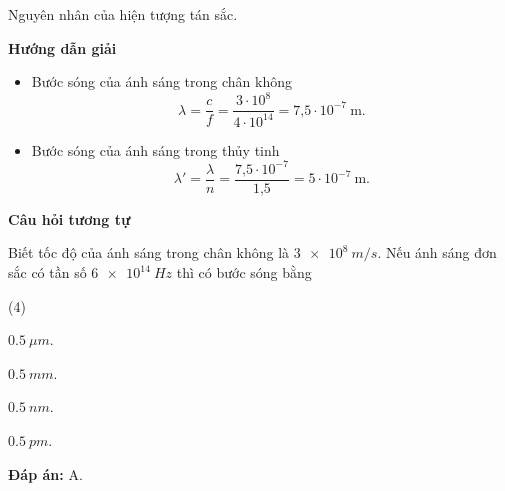 \begin{dang}{Nguyên nhân của hiện tượng tán sắc.}
	{	\begin{center}
			\textbf{Hướng dẫn giải}
		\end{center}
		
		\begin{itemize}
	\item Bước sóng của ánh sáng trong chân không
	\begin{equation*}
		\lambda =\dfrac{c}{f}=\dfrac{3\cdot 10^8}{4\cdot 10^{14}}=\text{7,5}\cdot 10^{-7}\ \text{m}.
	\end{equation*}
	\item Bước sóng của ánh sáng trong thủy tinh
	\begin{equation*}
		\lambda' =\dfrac{\lambda}{n}=\dfrac{\text{7,5}\cdot 10^{-7}}{\text{1,5}}= 5 \cdot 10^{-7}\ \text{m}.
	\end{equation*}
\end{itemize}
		
	\begin{center}
	\textbf{Câu hỏi tương tự}
	\end{center}

Biết tốc độ của ánh sáng trong chân không là $ \SI{3e8}{m/s} $. Nếu ánh sáng đơn sắc có tần số $ \SI{6 e14}{Hz} $ thì có bước sóng bằng
\begin{mcq}(4)
	\item $ \SI{0,5}{\mu m} $.
	\item $ \SI{0,5}{mm} $.
	\item $ \SI{0,5}{nm} $.
	\item $ \SI{0,5}{pm} $.
\end{mcq}
	
	
	\textbf{Đáp án:} A.
	}
\end{dang}

